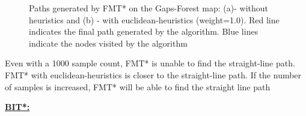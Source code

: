 \documentclass{article}
\begin{document}
\begin{figure}[H]
	\caption{Paths generated by FMT* on the Gaps-Forest map: (a)- without heuristics and (b) - with euclidean-heuristics (weight=1.0). Red line indicates the final path generated by the algorithm. Blue lines indicate the nodes visited by the algorithm}
	\label{fmt:straightlinepath}
\end{figure}

Even with a 1000 sample count, FMT* is unable to find the straight-line path. FMT* with euclidean-heuristics is closer to the straight-line path. If the number of samples is increased, FMT* will be able to find the straight line path

\textbf{\underline{BIT*:}}
\end{document}
